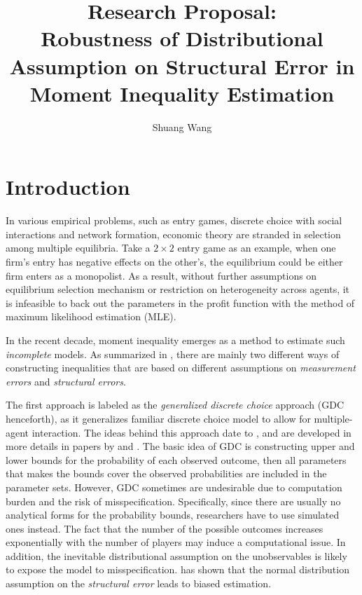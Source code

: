 \documentclass[a4paper]{article}
\title{Research Proposal:\\
Robustness of Distributional Assumption on Structural Error in Moment Inequality Estimation}
\author{Shuang Wang}
\begin{document}
\maketitle



\section{Introduction}


In various empirical problems, such as entry games, discrete choice with social interactions and network formation, economic theory are stranded in selection among multiple equilibria. Take a $2\times2$ entry game as an example, when one firm's entry has negative effects on the other's, the equilibrium could be either firm enters as a monopolist. As a result, without further assumptions on equilibrium selection mechanism or restriction on heterogeneity across agents, it is infeasible to back out the parameters in the profit function with the method of maximum likelihood estimation (MLE).

In the recent decade, moment inequality emerges as a method to estimate such \textit{incomplete} models. As summarized in \cite{pakes2010alternative}, there are mainly two different ways of constructing inequalities that are based on different assumptions on \textit{measurement errors} and \textit{structural errors}. 

The first approach is labeled as the \textit{generalized discrete choice} approach (GDC henceforth), as it generalizes familiar discrete choice model to allow for multiple-agent interaction. The ideas behind this approach date to \cite{tamer2003incomplete}, and are developed in more details in papers by \cite{ciliberto2009market} and \cite{andrews2004confidence}. The basic idea of GDC is constructing upper and lower bounds for the probability of each observed outcome, then all parameters that makes the bounds cover the observed probabilities are included in the parameter sets. However, GDC sometimes are undesirable due to computation burden and the risk of misspecification. Specifically, since there are usually no analytical forms for the probability bounds, researchers have to use simulated ones instead. The fact that the number of the possible outcomes increases exponentially with the number of players may induce a computational issue. In addition, the inevitable distributional assumption on the unobservables is likely to expose the model to misspecification. \cite{pakes2010alternative} has shown that the normal distribution assumption on the \textit{structural error} leads to biased estimation.
\end{document}
